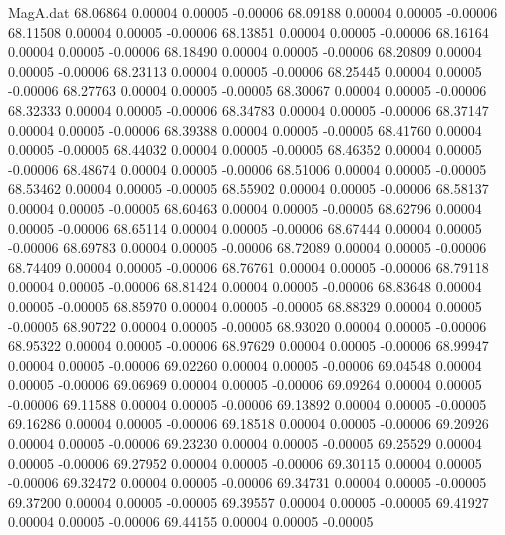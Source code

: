 \begin{filecontents}{MagA.dat}
  68.06864    0.00004    0.00005   -0.00006
  68.09188    0.00004    0.00005   -0.00006
  68.11508    0.00004    0.00005   -0.00006
  68.13851    0.00004    0.00005   -0.00006
  68.16164    0.00004    0.00005   -0.00006
  68.18490    0.00004    0.00005   -0.00006
  68.20809    0.00004    0.00005   -0.00006
  68.23113    0.00004    0.00005   -0.00006
  68.25445    0.00004    0.00005   -0.00006
  68.27763    0.00004    0.00005   -0.00005
  68.30067    0.00004    0.00005   -0.00006
  68.32333    0.00004    0.00005   -0.00006
  68.34783    0.00004    0.00005   -0.00006
  68.37147    0.00004    0.00005   -0.00006
  68.39388    0.00004    0.00005   -0.00005
  68.41760    0.00004    0.00005   -0.00005
  68.44032    0.00004    0.00005   -0.00005
  68.46352    0.00004    0.00005   -0.00006
  68.48674    0.00004    0.00005   -0.00006
  68.51006    0.00004    0.00005   -0.00005
  68.53462    0.00004    0.00005   -0.00005
  68.55902    0.00004    0.00005   -0.00006
  68.58137    0.00004    0.00005   -0.00005
  68.60463    0.00004    0.00005   -0.00005
  68.62796    0.00004    0.00005   -0.00006
  68.65114    0.00004    0.00005   -0.00006
  68.67444    0.00004    0.00005   -0.00006
  68.69783    0.00004    0.00005   -0.00006
  68.72089    0.00004    0.00005   -0.00006
  68.74409    0.00004    0.00005   -0.00006
  68.76761    0.00004    0.00005   -0.00006
  68.79118    0.00004    0.00005   -0.00006
  68.81424    0.00004    0.00005   -0.00006
  68.83648    0.00004    0.00005   -0.00005
  68.85970    0.00004    0.00005   -0.00005
  68.88329    0.00004    0.00005   -0.00005
  68.90722    0.00004    0.00005   -0.00005
  68.93020    0.00004    0.00005   -0.00006
  68.95322    0.00004    0.00005   -0.00006
  68.97629    0.00004    0.00005   -0.00006
  68.99947    0.00004    0.00005   -0.00006
  69.02260    0.00004    0.00005   -0.00006
  69.04548    0.00004    0.00005   -0.00006
  69.06969    0.00004    0.00005   -0.00006
  69.09264    0.00004    0.00005   -0.00006
  69.11588    0.00004    0.00005   -0.00006
  69.13892    0.00004    0.00005   -0.00005
  69.16286    0.00004    0.00005   -0.00006
  69.18518    0.00004    0.00005   -0.00006
  69.20926    0.00004    0.00005   -0.00006
  69.23230    0.00004    0.00005   -0.00005
  69.25529    0.00004    0.00005   -0.00006
  69.27952    0.00004    0.00005   -0.00006
  69.30115    0.00004    0.00005   -0.00006
  69.32472    0.00004    0.00005   -0.00006
  69.34731    0.00004    0.00005   -0.00005
  69.37200    0.00004    0.00005   -0.00005
  69.39557    0.00004    0.00005   -0.00005
  69.41927    0.00004    0.00005   -0.00006
  69.44155    0.00004    0.00005   -0.00005

\end{filecontents}
